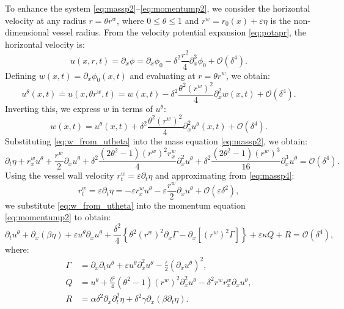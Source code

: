 \documentclass[alpha-refs, 12pt]{wiley-article}
\renewcommand{\O}{\mathcal{O}}
\renewcommand{\leq}{\leqslant}
\newcommand{\eps}{\varepsilon}
\begin{document}
To enhance the system \eqref{eq:massp2}--\eqref{eq:momentump2}, we consider the horizontal velocity at any radius $r = \theta r^w$, where $0 \leq \theta \leq 1$ and $r^w = r_0(x) + \eps \eta$ is the non-dimensional vessel radius. From the velocity potential expansion \eqref{eq:potapr}, the horizontal velocity is:
\[
  u(x, r, t) = \partial_x \phi = \partial_x \phi_0 - \delta^2 \frac{r^2}{4} \partial_x^3 \phi_0 + \O(\delta^4).
\]
Defining $w(x, t) = \partial_x \phi_0(x, t)$ and evaluating at $r = \theta r^w$, we obtain:
\begin{equation}\label{eq:generalu}
  u^\theta(x, t) \doteq u(x, \theta r^w, t) = w(x, t) - \delta^2 \frac{\theta^2 (r^w)^2}{4} \partial_x^2 w(x, t) + \O(\delta^4).
\end{equation}
Inverting this, we express $w$ in terms of $u^\theta$:
\begin{equation}\label{eq:w_from_utheta}
  w(x, t) = u^\theta(x, t) + \delta^2 \frac{\theta^2 (r^w)^2}{4} \partial_x^2 u^\theta(x, t) + \O(\delta^4).
\end{equation}
Substituting \eqref{eq:w_from_utheta} into the mass equation \eqref{eq:massp2}, we obtain:
\begin{equation}\label{eq:massp4}
  \partial_t \eta + r^w_x u^\theta + \frac{r^w}{2} \partial_x u^\theta + \delta^2 \frac{(2 \theta^2 - 1) (r^w)^2 r^w_x}{4} \partial_x^2 u^\theta + \delta^2 \frac{(2 \theta^2 - 1) (r^w)^3}{16} \partial_x^3 u^\theta = \O(\delta^4).
\end{equation}
Using the vessel wall velocity $r^w_t = \varepsilon \partial_t \eta$ and approximating from \eqref{eq:massp4}:
\begin{equation}\label{eq:rw_t}
  r^w_t = \varepsilon \partial_t \eta = -\varepsilon r^w_x u^\theta - \varepsilon \frac{r^w}{2} \partial_x u^\theta + \O(\varepsilon \delta^2),
\end{equation}
we substitute \eqref{eq:w_from_utheta} into the momentum equation \eqref{eq:momentump2} to obtain:
\begin{equation}\label{eq:momentump4}
  \partial_t u^\theta + \partial_x (\beta \eta) + \varepsilon u^\theta \partial_x u^\theta + \frac{\delta^2}{4} \left\{ \theta^2 (r^w)^2 \partial_x \Gamma - \partial_x [(r^w)^2 \Gamma] \right\} + \varepsilon \kappa Q + R = \O(\delta^4),
\end{equation}
where:
\begin{equation}\label{eq:gamman}
\begin{aligned}
  \Gamma &= \partial_x \partial_t u^\theta + \varepsilon u^\theta \partial_x^2 u^\theta - \frac{\varepsilon}{2} (\partial_x u^\theta)^2, \\
  Q &= u^\theta + \frac{\delta^2}{4} (\theta^2 - 1) (r^w)^2 \partial_x^2 u^\theta - \delta^2 r^w r^w_x \partial_x u^\theta, \\
  R &= \alpha \delta^2 \partial_x \partial_t^2 \eta + \delta^2 \gamma \partial_x (\beta \partial_t \eta).
\end{aligned}
\end{equation}
\end{document}

